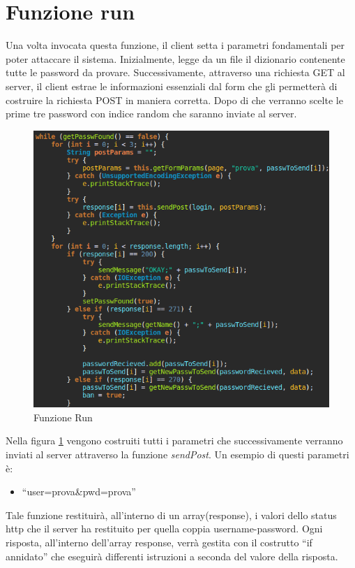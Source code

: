 \documentclass[a4paper,12pt,titlepage,oneside,openany]{book}
\begin{document}
\section{Funzione run}
Una volta invocata questa funzione, il client setta i parametri fondamentali per poter attaccare il sistema. Inizialmente, legge da un file il dizionario contenente tutte le password da provare. Successivamente, attraverso una richiesta GET al server, il client estrae le informazioni essenziali dal form che gli permetterà di costruire la richiesta POST in maniera corretta. Dopo di che verranno scelte le prime tre password con indice random che saranno inviate al server.
\begin{figure}[H]
	\centering
	\includegraphics[scale=0.6]{run1.png}
	\caption{Funzione Run}
	\label{fig:run1}
\end{figure}
\noindent
Nella figura \ref{fig:run1} vengono costruiti tutti i parametri che successivamente verranno inviati al server attraverso la funzione \textit{sendPost}. Un esempio di questi parametri è:
\begin{itemize}
	\centering \item []“user=prova\&pwd=prova”
\end{itemize}
\noindent
Tale funzione restituirà, all'interno di un array(response), i valori dello status http che il server ha restituito per quella coppia username-password. Ogni risposta, all'interno dell'array response, verrà gestita con il costrutto “if annidato” che eseguirà differenti istruzioni a seconda del valore della risposta.
\end{document}
